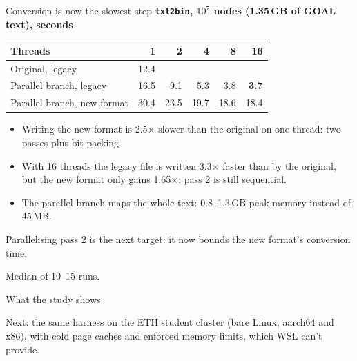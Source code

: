 \documentclass[aspectratio=169,11pt]{beamer}
\newcommand{\highlight}[1]{\colorbox{cream}{\parbox{\dimexpr\linewidth-2\fboxsep}{\small #1}}}
\newcommand{\source}[1]{{\scriptsize\color{black!55}\par\vspace{2mm}#1\par}}
\begin{document}
\begin{frame}[t]{Conversion is now the slowest step}
\centering\textbf{\texttt{txt2bin}, $10^7$ nodes (1.35\,GB of GOAL text), seconds}\par\vspace{2mm}
\footnotesize
\begin{tabular}{lrrrrr}
\toprule
\textbf{Threads} & \textbf{1} & \textbf{2} & \textbf{4} & \textbf{8} & \textbf{16} \\
\midrule
Original, legacy & 12.4 & & & & \\
Parallel branch, legacy & 16.5 & 9.1 & 5.3 & 3.8 & \textbf{3.7} \\
Parallel branch, new format & 30.4 & 23.5 & 19.7 & 18.6 & 18.4 \\
\bottomrule
\end{tabular}
\par\raggedright\vspace{5mm}
\small
\begin{itemize}
\item Writing the new format is 2.5$\times$ slower than the original on one thread: two passes plus bit packing.
\item With 16 threads the legacy file is written 3.3$\times$ faster than by the original, but the new format only gains 1.65$\times$: pass 2 is still sequential.
\item The parallel branch maps the whole text: 0.8--1.3\,GB peak memory instead of 45\,MB.
\end{itemize}
\highlight{Parallelising pass 2 is the next target: it now bounds the new format's conversion time.}
\source{Median of 10--15 runs. \studysource}
\end{frame}

\begin{frame}{What the study shows}
\centering\vfill
{}
\vfill
\par\raggedright
\highlight{Next: the same harness on the ETH student cluster (bare Linux, aarch64 and x86), with cold page caches and enforced memory limits, which WSL can't provide.}
\end{frame}
\end{document}
